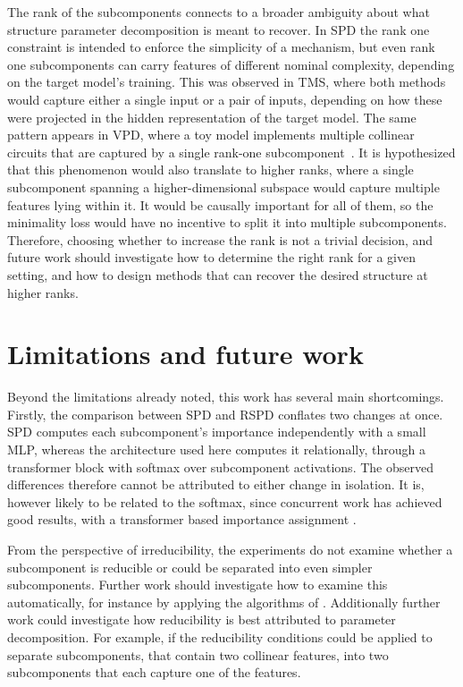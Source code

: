 \documentclass{article}
\begin{document}
The rank of the subcomponents connects to a broader ambiguity about what structure
parameter decomposition is meant to recover. In SPD the rank one constraint is
intended to enforce the simplicity of a mechanism, but even rank one
subcomponents can carry features of different nominal complexity,
depending on the target model's training. This was observed in TMS, where both methods would capture
either a single input or a pair of inputs, depending on how these were projected in
the hidden representation of the target model. 
The same pattern appears in VPD, where a toy model implements multiple collinear
circuits that are captured by a single rank-one subcomponent~\autocite{bushnaq2026interpreting_new_spd}.
It is hypothesized that this phenomenon would also translate to higher ranks, where
a single subcomponent spanning a higher-dimensional subspace would capture multiple
features lying within it. It would be causally important for all of them, so the
minimality loss would have no incentive to split it into multiple subcomponents.
Therefore, choosing whether to increase the rank is not a trivial decision,
and future work should investigate how to determine the right rank for a given setting,
and how to design methods that can recover the desired structure at higher ranks.

\section{Limitations and future work}
Beyond the limitations already noted, this
work has several main shortcomings.
Firstly, the comparison between SPD and RSPD conflates two changes at once.
SPD computes each subcomponent's
importance independently with a small MLP, whereas
the architecture used here computes it relationally,
through a transformer block with softmax over subcomponent
activations. The observed differences therefore cannot
be attributed to either change in isolation. It is, however
likely to be related to the softmax, since
concurrent work has achieved good results, with a transformer
based importance assignment \autocite{bushnaq2026interpreting_new_spd}.

From the perspective of irreducibility, the experiments
do not examine whether a subcomponent is 
reducible or could be separated into even simpler subcomponents.
Further work should investigate how to examine this automatically,
for instance by applying the algorithms of
\autocite{engels2025languagemodelfeaturesonedimensionally}.
Additionally further work could investigate how 
reducibility is best attributed to parameter decomposition.
For example, if the reducibility conditions 
could be applied to separate subcomponents, that
contain two collinear features, into two
subcomponents that each capture one of the features.
\autocite{bushnaq2026interpreting_new_spd}
\end{document}
